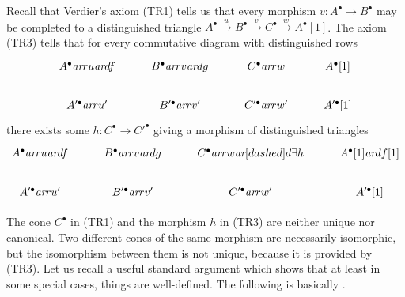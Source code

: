 \documentclass[leqno,12pt]{article}
\theoremstyle{plain}
\theoremstyle{definition}
\newcommand{\ar}{\text{\it ar}}
\begin{document}
Recall that Verdier's axiom (TR1) tells us that every morphism
$v\colon A^\bullet \to B^\bullet$ may be completed to a distinguished triangle
$A^\bullet \xrightarrow{u} B^\bullet \xrightarrow{v} C^\bullet \xrightarrow{w} A^\bullet [1]$.
The axiom (TR3) tells that for every commutative diagram with
distinguished rows
\begin{equation}
  \label{eqn:TR3-input}
  \begin{tikzcd}
    A^\bullet\ar{r}{u}\ar{d}{f} & B^\bullet\ar{r}{v}\ar{d}{g} & C^\bullet\ar{r}{w} & A^\bullet [1] \\
    A'^\bullet\ar{r}{u'} & B'^\bullet\ar{r}{v'} & C'^\bullet\ar{r}{w'} & A'^\bullet [1]
  \end{tikzcd}
\end{equation}
there exists some $h\colon C^\bullet \to C'^\bullet$ giving a morphism of
distinguished triangles
\begin{equation}
  \label{eqn:TR3-output}
  \begin{tikzcd}
    A^\bullet\ar{r}{u}\ar{d}{f} & B^\bullet\ar{r}{v}\ar{d}{g} & C^\bullet\ar{r}{w}\ar[dashed]{d}{\exists h} & A^\bullet [1]\ar{d}{f [1]} \\
    A'^\bullet\ar{r}{u'} & B'^\bullet\ar{r}{v'} & C'^\bullet\ar{r}{w'} & A'^\bullet [1]
  \end{tikzcd}
\end{equation}

The cone $C^\bullet$ in (TR1) and the morphism $h$ in (TR3) are neither unique
nor canonical. Two different cones of the same morphism are necessarily
isomorphic, but the isomorphism between them is not unique, because it is
provided by (TR3).
Let us recall a useful standard argument which shows that at least in some
special cases, things are well-defined. The following is basically
\cite[Proposition~1.1.9, Corollaire~1.1.10]{Beilinson-Bernstein-Deligne}.
\end{document}
